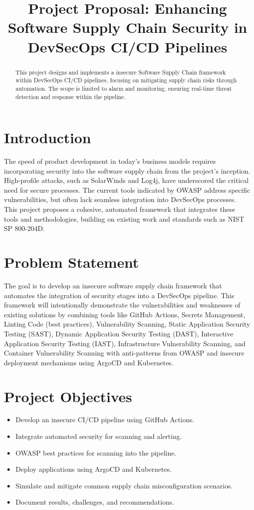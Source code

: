\documentclass[conference]{IEEEtran}
\title{Project Proposal: Enhancing Software Supply Chain Security in DevSecOps CI/CD Pipelines}
\author{
    \IEEEauthorblockN{Marlon Brenes R}
    \IEEEauthorblockA{
        Student ID: 1314316 \\
        Master's in Cybersecurity \\
        \href{mailto:marlon.brenes@nyit.edu}{marlon.brenes@nyit.edu}
    }
}
\date{}
\begin{document}
\maketitle

\begin{abstract}
This project designs and implements a insecure Software Supply Chain framework within DevSecOps CI/CD pipelines, focusing on mitigating supply chain risks through automation. The scope is limited to alarm and monitoring, ensuring real-time threat detection and response within the pipeline.
\end{abstract}

\section{Introduction}
The speed of product development in today's business models requires incorporating security into the software supply chain from the project's inception. High-profile attacks, such as SolarWinds and Log4j, have underscored the critical need for secure processes. The current tools indicated by OWASP address specific vulnerabilities, but often lack seamless integration into DevSecOps processes. This project proposes a cohesive, automated framework that integrates these tools and methodologies, building on existing work and standards such as NIST SP 800-204D.

\section{Problem Statement}
The goal is to develop an insecure software supply chain framework that automates the integration of security stages into a DevSecOps pipeline. This framework will intentionally demonstrate the vulnerabilities and weaknesses of existing solutions by combining tools like GitHub Actions, Secrets Management, Linting Code (best practices), Vulnerability Scanning, Static Application Security Testing (SAST), Dynamic Application Security Testing (DAST), Interactive Application Security Testing (IAST), Infrastructure Vulnerability Scanning, and Container Vulnerability Scanning with anti-patterns from OWASP and insecure deployment mechanisms using ArgoCD and Kubernetes.

\section{Project Objectives}
\begin{itemize}
    \item Develop an insecure CI/CD pipeline using GitHub Actions.
    \item Integrate automated security for scanning and alerting.
    \item OWASP best practices for scanning into the pipeline.
    \item Deploy applications using ArgoCD and Kubernetes.
    \item Simulate and mitigate common supply chain misconfiguration scenarios.
    \item Document results, challenges, and recommendations.
\end{itemize}
\end{document}
